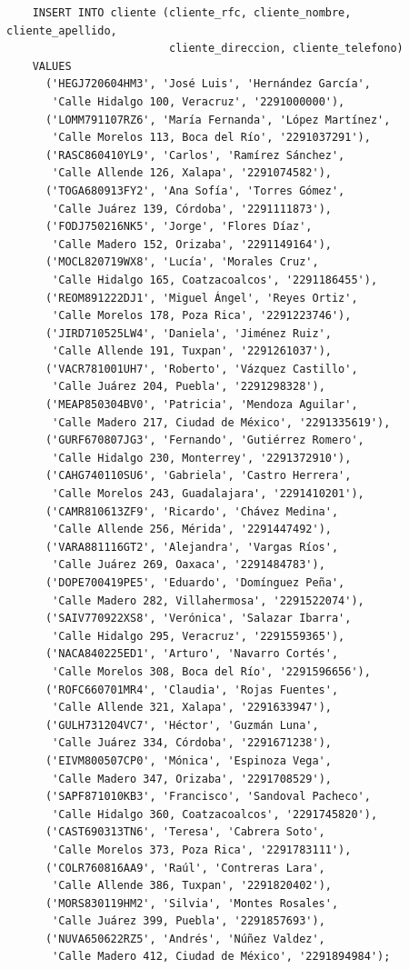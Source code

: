 \begin{verbatim}
	INSERT INTO cliente (cliente_rfc, cliente_nombre, cliente_apellido,
	                     cliente_direccion, cliente_telefono)
	VALUES
	  ('HEGJ720604HM3', 'José Luis', 'Hernández García',
	   'Calle Hidalgo 100, Veracruz', '2291000000'),
	  ('LOMM791107RZ6', 'María Fernanda', 'López Martínez',
	   'Calle Morelos 113, Boca del Río', '2291037291'),
	  ('RASC860410YL9', 'Carlos', 'Ramírez Sánchez',
	   'Calle Allende 126, Xalapa', '2291074582'),
	  ('TOGA680913FY2', 'Ana Sofía', 'Torres Gómez',
	   'Calle Juárez 139, Córdoba', '2291111873'),
	  ('FODJ750216NK5', 'Jorge', 'Flores Díaz',
	   'Calle Madero 152, Orizaba', '2291149164'),
	  ('MOCL820719WX8', 'Lucía', 'Morales Cruz',
	   'Calle Hidalgo 165, Coatzacoalcos', '2291186455'),
	  ('REOM891222DJ1', 'Miguel Ángel', 'Reyes Ortiz',
	   'Calle Morelos 178, Poza Rica', '2291223746'),
	  ('JIRD710525LW4', 'Daniela', 'Jiménez Ruiz',
	   'Calle Allende 191, Tuxpan', '2291261037'),
	  ('VACR781001UH7', 'Roberto', 'Vázquez Castillo',
	   'Calle Juárez 204, Puebla', '2291298328'),
	  ('MEAP850304BV0', 'Patricia', 'Mendoza Aguilar',
	   'Calle Madero 217, Ciudad de México', '2291335619'),
	  ('GURF670807JG3', 'Fernando', 'Gutiérrez Romero',
	   'Calle Hidalgo 230, Monterrey', '2291372910'),
	  ('CAHG740110SU6', 'Gabriela', 'Castro Herrera',
	   'Calle Morelos 243, Guadalajara', '2291410201'),
	  ('CAMR810613ZF9', 'Ricardo', 'Chávez Medina',
	   'Calle Allende 256, Mérida', '2291447492'),
	  ('VARA881116GT2', 'Alejandra', 'Vargas Ríos',
	   'Calle Juárez 269, Oaxaca', '2291484783'),
	  ('DOPE700419PE5', 'Eduardo', 'Domínguez Peña',
	   'Calle Madero 282, Villahermosa', '2291522074'),
	  ('SAIV770922XS8', 'Verónica', 'Salazar Ibarra',
	   'Calle Hidalgo 295, Veracruz', '2291559365'),
	  ('NACA840225ED1', 'Arturo', 'Navarro Cortés',
	   'Calle Morelos 308, Boca del Río', '2291596656'),
	  ('ROFC660701MR4', 'Claudia', 'Rojas Fuentes',
	   'Calle Allende 321, Xalapa', '2291633947'),
	  ('GULH731204VC7', 'Héctor', 'Guzmán Luna',
	   'Calle Juárez 334, Córdoba', '2291671238'),
	  ('EIVM800507CP0', 'Mónica', 'Espinoza Vega',
	   'Calle Madero 347, Orizaba', '2291708529'),
	  ('SAPF871010KB3', 'Francisco', 'Sandoval Pacheco',
	   'Calle Hidalgo 360, Coatzacoalcos', '2291745820'),
	  ('CAST690313TN6', 'Teresa', 'Cabrera Soto',
	   'Calle Morelos 373, Poza Rica', '2291783111'),
	  ('COLR760816AA9', 'Raúl', 'Contreras Lara',
	   'Calle Allende 386, Tuxpan', '2291820402'),
	  ('MORS830119HM2', 'Silvia', 'Montes Rosales',
	   'Calle Juárez 399, Puebla', '2291857693'),
	  ('NUVA650622RZ5', 'Andrés', 'Núñez Valdez',
	   'Calle Madero 412, Ciudad de México', '2291894984');


\end{verbatim}
